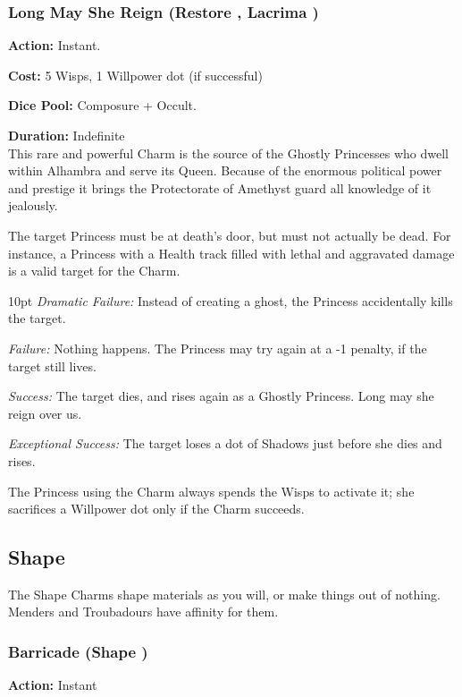 \subsubsection*{Long May She Reign (Restore \textbullet\textbullet\textbullet\textbullet\textbullet, Lacrima \textbullet\textbullet\textbullet\textbullet\textbullet)}

\noindent \textbf{Action:} Instant. 

\noindent \textbf{Cost:} 5 Wisps, 1 Willpower dot (if successful)

\noindent \textbf{Dice Pool:} Composure + Occult.

\noindent \textbf{Duration:} Indefinite \\

\noindent This rare and powerful Charm is the source of the Ghostly Princesses who dwell within Alhambra and serve its Queen. Because of the enormous political power and prestige it brings the Protectorate of Amethyst guard all knowledge of it jealously.

The target Princess must be at death's door, but must not actually be dead. For instance, a Princess with a Health track filled with lethal and aggravated damage is a valid target for the Charm.

\begin{myindentpar}{10pt}    \emph{Dramatic Failure:} Instead of creating a ghost, the Princess accidentally kills the target.

    \emph{Failure:} Nothing happens. The Princess may try again at a -1 penalty, if the target still lives.
    
    \emph{Success:} The target dies, and rises again as a Ghostly Princess. Long may she reign over us.
    
    \emph{Exceptional Success:} The target loses a dot of Shadows just before she dies and rises.\end{myindentpar}

The Princess using the Charm always spends the Wisps to activate it; she sacrifices a Willpower dot only if the Charm succeeds.

\subsection*{Shape}
\label{subsec:Shape}
The Shape Charms shape materials as you will, or make things out of nothing. Menders and Troubadours have affinity for them.

\subsubsection*{Barricade (Shape \textbullet)}
\noindent \textbf{Action:} Instant \\


